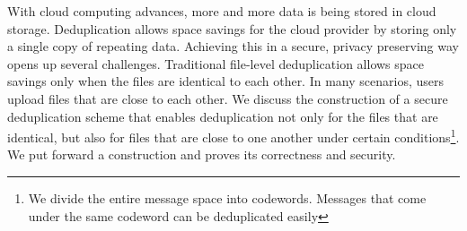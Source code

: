 With cloud computing advances, more and more data is being stored in cloud storage. Deduplication
allows space savings for the cloud provider by storing only a single copy of repeating data.
Achieving this in a secure, privacy preserving way opens up several challenges. Traditional file-level deduplication allows space savings only when the files are identical to each other. In many scenarios, users upload files that are close to each other.
We discuss the construction of a secure deduplication scheme that enables deduplication not only for the files that are identical, but also for files that are close to one another under certain conditions\footnote{We divide the entire message space into codewords. Messages that come under the same codeword can be deduplicated easily}. We put forward a construction and proves its correctness and security.